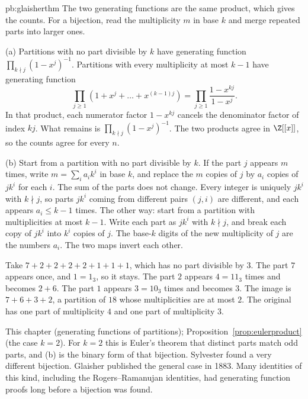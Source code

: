 \begin{solution}{pb:glaisherthm}
\idea The two generating functions are the same product, which gives the counts. For a bijection, read the multiplicity $m$ in base $k$ and merge repeated parts into larger ones.

\writeup (a) Partitions with no part divisible by $k$ have generating function $\prod_{k\nmid j}(1-x^j)^{-1}$. Partitions
with every multiplicity at most $k-1$ have generating function
\[
\prod_{j\ge1}(1+x^j+\dots+x^{(k-1)j})=\prod_{j\ge1}\frac{1-x^{kj}}{1-x^j}.
\]
In that product, each numerator factor $1-x^{kj}$ cancels the denominator factor of index $kj$. What remains
is $\prod_{k\nmid j}(1-x^j)^{-1}$. The two products agree in $\Z[[x]]$, so the counts agree for every $n$.

(b) Start from a partition with no part divisible by $k$. If the part $j$ appears $m$ times, write $m=\sum_ia_ik^i$ in base $k$, and
replace the $m$ copies of $j$ by $a_i$ copies of $jk^i$ for each $i$. The sum of the parts does not change. Every integer is uniquely $jk^i$ with
$k\nmid j$, so parts $jk^i$ coming from different pairs $(j,i)$ are different, and each appears $a_i\le k-1$ times. The other way: start from a
partition with multiplicities at most $k-1$. Write each part as $jk^i$ with $k\nmid j$, and break each copy of $jk^i$ into $k^i$
copies of $j$. The base-$k$ digits of the new multiplicity of $j$ are the numbers $a_i$. The two maps invert each other.

Take $7+2+2+2+2+1+1+1$, which has no part divisible by $3$. The part $7$ appears once, and $1=1_3$, so it stays. The part $2$ appears $4=11_3$
times and becomes $2+6$. The part $1$ appears $3=10_3$ times and becomes $3$. The image is $7+6+3+2$, a partition of $18$ whose
multiplicities are at most $2$. The original has one part of multiplicity $4$ and one part of multiplicity $3$.

\tools This chapter (generating functions of partitions); Proposition~\ref{prop:eulerproduct} (the case $k=2$).
\leads For $k=2$ this is Euler's theorem that distinct parts match odd parts, and (b) is the binary form of that bijection. Sylvester found a very
different bijection. Glaisher published the general case in 1883. Many identities of this kind, including the Rogers--Ramanujan identities, had generating
function proofs long before a bijection was found.
\end{solution}

